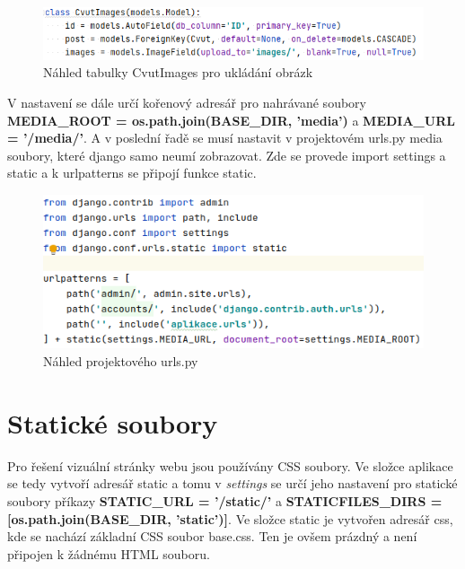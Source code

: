 \begin{figure}[H] \centering
    \includegraphics[width=430pt]{./pictures/9-db-cvutimages.PNG}
    \caption[Náhled tabulky CvutImages pro ukládání obrázků]{Náhled tabulky CvutImages pro ukládání obrázk}
	\label{fig:Náhled tabulky CvutImages pro ukládání obrázk}              
\end{figure}


V nastavení se dále určí kořenový adresář pro nahrávané soubory
\textbf{MEDIA\_ROOT = os.path.join(BASE\_DIR, 'media')} a
\textbf{MEDIA\_URL = '/media/'}.  A v poslední řadě se musí nastavit v
projektovém urls.py media soubory, které django samo neumí
zobrazovat. Zde se provede import settings a static a k urlpatterns se
připojí funkce static.

\begin{figure}[H] \centering
    \includegraphics[width=380pt]{./pictures/10-media-urlspy.PNG}
    \caption[Náhled projektového urls.py]{Náhled projektového urls.py}
	\label{fig:Náhled projektového urls.py}              
\end{figure}

\newpage

\section{Statické soubory}

Pro řešení vizuální stránky webu jsou používány CSS soubory. Ve složce
aplikace se tedy vytvoří adresář static a tomu v \emph{settings} se
určí jeho nastavení pro statické soubory příkazy \textbf{STATIC\_URL =
  '/static/'} a \textbf{STATICFILES\_DIRS = [os.path.join(BASE\_DIR,
  'static')]}. Ve složce static je vytvořen adresář css, kde se
nachází základní CSS soubor base.css. Ten je ovšem prázdný a není
připojen k žádnému HTML souboru.

